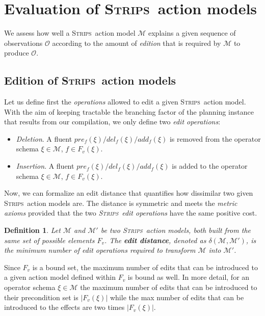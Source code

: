 \documentclass{article}
\newcommand{\strips}{\textsc{Strips}}     %
\newtheorem{definition}[theorem]{Definition}
\begin{document}
\section{Evaluation of \strips\ action models}
We assess how well a \strips\ action model $\mathcal{M}$ explains a given sequence of observations $\mathcal{O}$ according to the amount of {\em edition} that is required by $\mathcal{M}$ to produce $\mathcal{O}$. %

\subsection{Edition of \strips\ action models}
Let us define first the \emph{operations} allowed to edit a given \strips\ action model. With the aim of keeping tractable the branching factor of the planning instance that results from our compilation, we only define two {\em edit operations}:
\begin{itemize}
\item {\em Deletion}. A fluent $pre_f(\xi)/del_f(\xi)/add_f(\xi)$ is removed from the operator schema $\xi\in\mathcal{M}$, $f\in F_v(\xi)$.
\item {\em Insertion}. A fluent $pre_f(\xi)/del_f(\xi)/add_f(\xi)$ is added to the operator schema $\xi\in\mathcal{M}$, $f\in F_v(\xi)$.
\end{itemize}

Now, we can formalize an edit distance that quantifies how dissimilar two given \strips\ action models are. The distance is symmetric and meets the {\em metric axioms} provided that the two {\em \strips\ edit operations} have the same positive cost.

\begin{definition}
Let $\mathcal{M}$ and $\mathcal{M}'$ be two \strips\ action models, both built from the same set of possible elements $F_v$. The {\bf edit distance}, denoted as $\delta(\mathcal{M},\mathcal{M}')$, is the minimum number of {\em edit operations} required to transform $\mathcal{M}$ into $\mathcal{M}'$.
\end{definition}

Since $F_v$ is a bound set, the maximum number of edits that can be introduced to a given action model defined within $F_v$ is bound as well. In more detail, for an operator schema $\xi\in\mathcal{M}$ the maximum number of edits that can be introduced to their precondition set is $|F_v(\xi)|$ while the max number of edits that can be introduced to the effects are two times $|F_v(\xi)|$.
\end{document}
